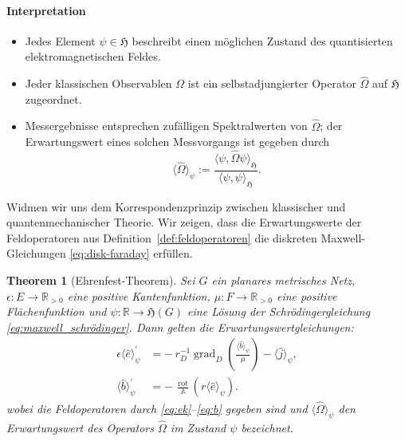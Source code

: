 \documentclass[11pt,a4paper,leqno]{report}
\newtheorem{theorem}{Theorem}[chapter]
\numberwithin{equation}{chapter}
\begin{document}
\paragraph{Interpretation}
\begin{itemize}
	\item Jedes Element \(\psi \in \mathfrak{H}\) beschreibt einen möglichen Zustand des quantisierten elektromagnetischen Feldes. 
	\item Jeder klassischen Observablen \(\Omega\) ist ein selbstadjungierter Operator \(\hat{\Omega}\) auf \(\mathfrak{H}\) zugeordnet. 
	\item Messergebnisse entsprechen zufälligen Spektralwerten von \(\hat{\Omega}\); 
	der Erwartungswert eines solchen Messvorgangs ist gegeben durch
	\[
	\langle \hat{\Omega} \rangle_\psi:=\frac{\langle \psi, \hat{\Omega}\psi \rangle_{\mathfrak{H}}}{\langle \psi, \psi \rangle_{\mathfrak{H}}}.
	\]
\end{itemize}
\noindent
Widmen wir uns dem Korrespondenzprinzip zwischen klassischer und quantenmechanischer Theorie. 
Wir zeigen, dass die Erwartungswerte der Feldoperatoren aus Definition~\ref{def:feldoperatoren} 
die diskreten Maxwell-Gleichungen \eqref{eq:disk-faraday} erfüllen.
\begin{theorem}[Ehrenfest-Theorem] \label{thm:ehrenfest}
	Sei \(G\) ein planares metrisches Netz, \(\epsilon: E \to \mathbb{R}_{>0}\) eine positive 
	Kantenfunktion, \(\mu: F \to \mathbb{R}_{>0}\) eine positive Flächenfunktion und 
	\(\psi: \mathbb{R} \to \mathfrak{H}(G)\) eine Lösung der Schrödingergleichung 
	\eqref{eq:maxwell_schrödinger}. Dann gelten die Erwartungswertgleichungen:
	\begin{align}
		\epsilon \langle \hat{e} \rangle_\psi^\prime
		&= -\,r_D^{-1}\operatorname{grad}_D\!\left(\frac{\langle \hat{b} \rangle_\psi}{\mu}\right) 
		- \langle \hat{j} \rangle_\psi, \label{eq:ehrenfest_1} \\[4pt]
		\langle \hat{b} \rangle_\psi^\prime
		&= -\,\frac{\operatorname{rot}}{\mathbb{A}}(r\langle \hat{e} \rangle_\psi). \label{eq:ehrenfest_2}
	\end{align}
	wobei die Feldoperatoren durch \eqref{eq:ek}--\eqref{eq:b} gegeben sind und 
	\(\langle \hat{\Omega} \rangle_\psi\) den Erwartungswert des Operators \(\hat{\Omega}\) 
	im Zustand \(\psi\) bezeichnet.
\end{theorem}
\end{document}
